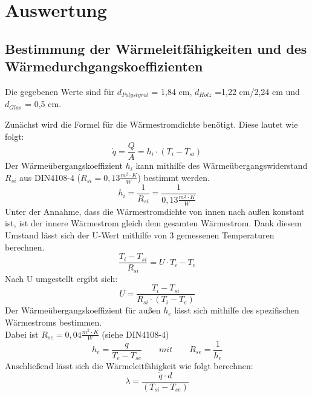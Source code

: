 \section{Auswertung}
\subsection{Bestimmung der Wärmeleitfähigkeiten und des Wärmedurchgangskoeffizienten}
Die gegebenen Werte sind für $d_{Polystyrol}$ = 1,84 cm, $d_{Holz}$ =1,22 cm/2,24 cm und $d_{Glas}$ = 0,5 cm.

Zunächst wird die Formel für die Wärmestromdichte benötigt. Diese lautet wie folgt:
\begin{equation}
\dot q=\frac{ Q }{ A }=h_{ i }\cdot(T_{ i }-T_{si})
  \label{eq:230514_Wärmestromdichte}
\end{equation}
Der Wärmeübergangskoeffizient $h_{i}$ kann mithilfe des Wärmeübergangswiderstand $R_{si}$ aus DIN4108-4 ($R_{si}=0,13 \frac{m^2 \cdot K}{W} $) bestimmt werden.
\begin{equation}
h_{i}=\frac{ 1 }{ R_{ si } }=\frac{ 1 }{ 0,13 \frac{m^2\cdot K}{ W }}
  \label{eq:230514_Wärmeübergangskoeffizient}
\end{equation}
Unter der Annahme, dass die Wärmestromdichte von innen nach außen konstant ist, ist der innere Wärmestrom gleich dem gesamten Wärmestrom. Dank diesem Umstand lässt sich der U-Wert mithilfe von 3 gemessenen Temperaturen berechnen.
\begin{equation}
\frac{ T_{i} - T_{si}}{ R_{ si } }=U \cdot T_{i} - T_{e}
  \label{eq:230514_u1}
\end{equation}
Nach U umgestellt ergibt sich: 
\begin{equation}
U = \frac{ T_{i} - T_{si}}{ R_{ si } \cdot  (T_{i} - T_{e})}
  \label{eq:230514_u2}
\end{equation}
Der Wärmeübergangskoeffizient für außen $h_{e}$ lässt sich mithilfe des spezifischen Wärmestroms bestimmen.
\\Dabei ist $R_{se}=0,04 \frac{ m^2 \cdot K }{W}$ (siehe DIN4108-4)
\begin{equation}
h_{e}=\frac{ \dot q }{ T_{e} - T_{se} }   \qquad  mit     \qquad       R_{se}=\frac{ 1 }{ h_{e} }
  \label{eq:230514_h_e}
\end{equation}
Anschließend lässt sich die Wärmeleitfähigkeit wie folgt berechnen:
\begin{equation}
\lambda=\frac{ \dot q \cdot d }{  ( T_{si} - T_{se} )}
  \label{eq:230514_lamda}
\end{equation}

